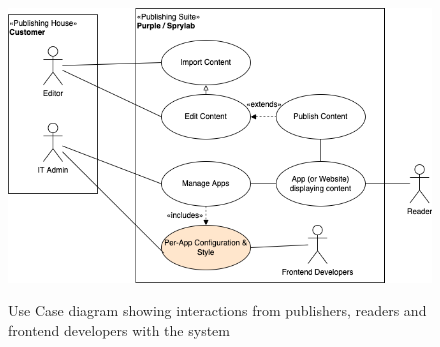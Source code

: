 \begin{figure}[h]
  \caption{Use Case diagram showing interactions from publishers, readers and frontend developers with the system}
  \includegraphics[width=\textwidth]{pics/purple-abstract.drawio.png}
  \label{fig:usecase1}
\end{figure}

